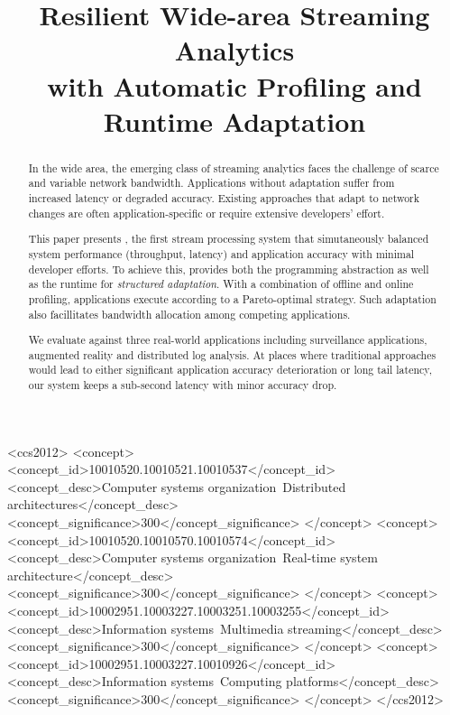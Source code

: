 \documentclass[10pt, sigplan, anonymous, review]{acmart}
\begin{document}
\title{Resilient Wide-area Streaming Analytics \\
  with Automatic Profiling and Runtime Adaptation}

\renewcommand{\shortauthors}{B. Zhang et al.}



\begin{abstract}
  In the wide area, the emerging class of streaming analytics faces the
  challenge of scarce and variable network bandwidth. Applications without
  adaptation suffer from increased latency or degraded accuracy. Existing
  approaches that adapt to network changes are often application-specific or
  require extensive developers' effort.

  This paper presents \sysname{}, the first stream processing system that
  simutaneously balanced system performance (throughput, latency) and
  application accuracy with minimal developer efforts. To achieve this,
  \sysname{} provides both the programming abstraction as well as the runtime
  for \textit{structured adaptation}. With a combination of offline and online
  profiling, applications execute according to a Pareto-optimal strategy. Such
  adaptation also facillitates bandwidth allocation among competing
  applications.

  We evaluate \sysname{} against three real-world applications including
  surveillance applications, augmented reality and distributed log analysis. At
  places where traditional approaches would lead to either significant
  application accuracy deterioration or long tail latency, our system keeps a
  sub-second latency with minor accuracy drop.
\end{abstract}

%
\begin{CCSXML}
<ccs2012>
  <concept>
    <concept_id>10010520.10010521.10010537</concept_id>
    <concept_desc>Computer systems organization~Distributed architectures</concept_desc>
    <concept_significance>300</concept_significance>
  </concept>
  <concept>
    <concept_id>10010520.10010570.10010574</concept_id>
    <concept_desc>Computer systems organization~Real-time system architecture</concept_desc>
    <concept_significance>300</concept_significance>
  </concept>
  <concept>
    <concept_id>10002951.10003227.10003251.10003255</concept_id>
    <concept_desc>Information systems~Multimedia streaming</concept_desc>
    <concept_significance>300</concept_significance>
  </concept>
  <concept>
    <concept_id>10002951.10003227.10010926</concept_id>
    <concept_desc>Information systems~Computing platforms</concept_desc>
    <concept_significance>300</concept_significance>
  </concept>
</ccs2012>
\end{CCSXML}
\end{document}
